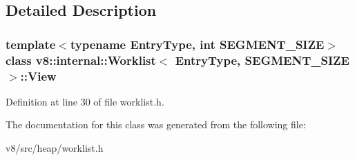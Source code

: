 \subsection{Detailed Description}
\subsubsection*{template$<$typename Entry\+Type, int S\+E\+G\+M\+E\+N\+T\+\_\+\+S\+I\+ZE$>$\newline
class v8\+::internal\+::\+Worklist$<$ Entry\+Type, S\+E\+G\+M\+E\+N\+T\+\_\+\+S\+I\+Z\+E $>$\+::\+View}



Definition at line 30 of file worklist.\+h.



The documentation for this class was generated from the following file\+:\begin{DoxyCompactItemize}
\item 
v8/src/heap/worklist.\+h\end{DoxyCompactItemize}
